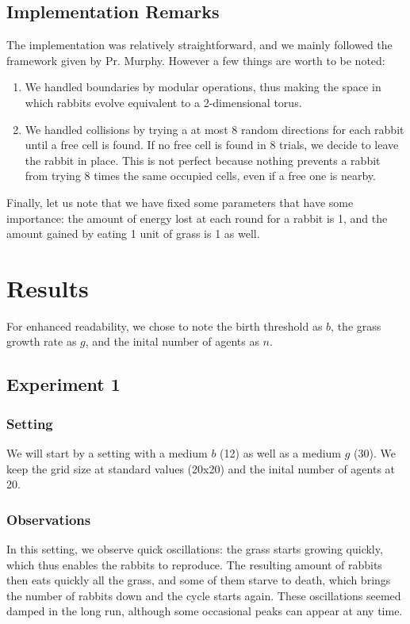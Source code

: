 \documentclass[11pt]{article}
\begin{document}
\subsection{Implementation Remarks}
The implementation was relatively straightforward, and we mainly followed the framework given by Pr. Murphy. However a few things are worth to be noted:
\begin{enumerate}
\item We handled boundaries by modular operations, thus making the space in which rabbits evolve equivalent to a 2-dimensional torus.
\item We handled collisions by trying a at most 8 random directions for each rabbit until a free cell is found. If no free cell is found in 8 trials, we decide to leave the rabbit in place. This is not perfect because nothing prevents a rabbit from trying 8 times the same occupied cells, even if a free one is nearby. 
\end{enumerate}
Finally, let us note that we have fixed some parameters that have some importance: the amount of energy lost at each round for a rabbit is 1, and the amount gained by eating 1 unit of grass is 1 as well.

\section{Results}
For enhanced readability, we chose to note the birth threshold as $b$, the grass growth rate as $g$, and the inital number of agents as $n$.

\subsection{Experiment 1}

\subsubsection{Setting}
We will start by a setting with a medium $b$ (12) as well as a medium $g$ (30). We keep the grid size at standard values (20x20) and the inital number of agents at 20.

\subsubsection{Observations}
In this setting, we observe quick oscillations: the grass starts growing quickly, which thus enables the rabbits to reproduce. The resulting amount of rabbits then eats quickly all the grass, and some of them starve to death, which brings the number of rabbits down and the cycle starts again. These oscillations seemed damped in the long run, although some occasional peaks can appear at any time.
\end{document}
